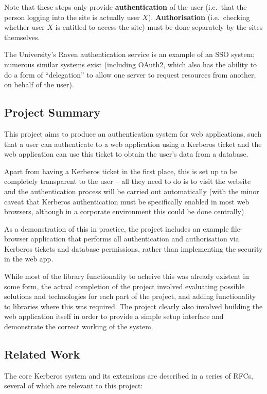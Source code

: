 \documentclass{article}
\begin{document}
Note that these steps only provide \textbf{authentication} of the user (i.e.\ that the person logging into the site is actually user $X$). \textbf{Authorisation} (i.e.\ checking whether user $X$ is entitled to access the site) must be done separately by the sites themselves.

The University's Raven authentication service is an example of an SSO system; numerous similar systems exist (including OAuth2, which also has the ability to do a form of ``delegation'' to allow one server to request resources from another, on behalf of the user\cite{Oracle-OAuth2}).

\subsection{Project Summary}
This project aims to produce an authentication system for web applications, such that a user can authenticate to a web application using a Kerberos ticket and the web application can use this ticket to obtain the user's data from a database.

Apart from having a Kerberos ticket in the first place, this is set up to be completely transparent to the user -- all they need to do is to visit the website and the authentication process will be carried out automatically (with the minor caveat that Kerberos authentication must be specifically enabled in most web browsers, although in a corporate environment this could be done centrally).

As a demonstration of this in practice, the project includes an example file-browser application that performs all authentication and authorisation via Kerberos tickets and database permissions, rather than implementing the security in the web app.

While most of the library functionality to acheive this was already existent in some form, the actual completion of the project involved evaluating possible solutions and technologies for each part of the project, and adding functionality to libraries where this was required. The project clearly also involved building the web application itself in order to provide a simple setup interface and demonstrate the correct working of the system.

\subsection{Related Work}
The core Kerberos system and its extensions are described in a series of RFCs, several of which are relevant to this project:
\end{document}
